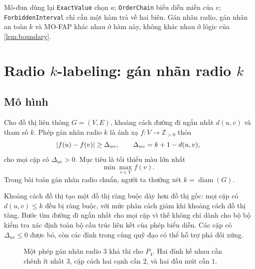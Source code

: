 \begin{keyidea}{Mô-đun dùng lại}
\texttt{ExactValue} chọn \(a\); \texttt{OrderChain} biểu diễn miền của \(v\);
\texttt{ForbiddenInterval} chỉ cần một hàm trả về hai biên. Gán nhãn radio,
gán nhãn an toàn \(k\) và MO-FAP khác nhau ở hàm này, không khác nhau ở lôgic của
\cref{lem:boundary}.
\end{keyidea}

\section[Radio k-labeling]{Radio \(k\)-labeling: gán nhãn radio \(k\)}

\subsection{Mô hình}

Cho đồ thị liên thông \(G=(V,E)\), khoảng cách đường đi ngắn nhất \(d(u,v)\) và
tham số \(k\). Phép gán nhãn radio \(k\) là ánh xạ
\(f:V\to\mathbb{Z}_{>0}\) thỏa
\[
  \lvert f(u)-f(v)\rvert
  \ge
  \Delta_{uv},
  \qquad
  \Delta_{uv}=k+1-d(u,v),
\]
cho mọi cặp có \(\Delta_{uv}>0\). Mục tiêu là tối thiểu màu lớn nhất
\[
  \min\max_{v\in V}f(v).
\]
Trong bài toán gán nhãn radio chuẩn, người ta thường xét
\(k=\operatorname{diam}(G)\).

Khoảng cách đồ thị tạo một đồ thị ràng buộc dày hơn đồ thị gốc: mọi cặp có
\(d(u,v)\le k\) đều bị ràng buộc, với mức phân cách giảm khi khoảng cách đồ
thị tăng. Bước tìm đường đi ngắn nhất cho mọi cặp vì thế không chỉ dành cho bộ
bộ kiểm tra xác định toàn bộ cấu trúc liên kết của phép biểu diễn. Các cặp có
\(\Delta_{uv}\le0\) được bỏ, còn các đỉnh trong cùng quỹ đạo có thể hỗ trợ phá
đối xứng.

\begin{figure}[tb]
\centering
{}
\caption{Một phép gán nhãn radio \(3\) khả thi cho \(P_4\). Hai đỉnh kề nhau
cần chênh ít nhất \(3\), cặp cách hai cạnh cần \(2\), và hai đầu mút cần \(1\).}
\label{fig:radio-p4}
\end{figure}


